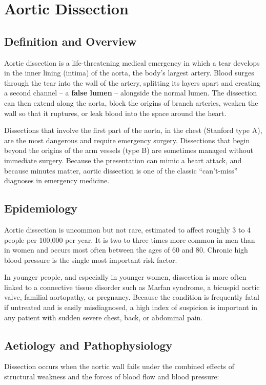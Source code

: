 \chapter{Aortic Dissection}

\section*{Definition and Overview}
Aortic dissection is a life-threatening medical emergency in which a tear develops in the inner lining (intima) of the aorta, the body's largest artery. Blood surges through the tear into the wall of the artery, splitting its layers apart and creating a second channel -- a \textbf{false lumen} -- alongside the normal lumen. The dissection can then extend along the aorta, block the origins of branch arteries, weaken the wall so that it ruptures, or leak blood into the space around the heart.

Dissections that involve the first part of the aorta, in the chest (Stanford type A), are the most dangerous and require emergency surgery. Dissections that begin beyond the origins of the arm vessels (type B) are sometimes managed without immediate surgery. Because the presentation can mimic a heart attack, and because minutes matter, aortic dissection is one of the classic ``can't-miss'' diagnoses in emergency medicine.

\section*{Epidemiology}
Aortic dissection is uncommon but not rare, estimated to affect roughly 3 to 4 people per 100,000 per year. It is two to three times more common in men than in women and occurs most often between the ages of 60 and 80. Chronic high blood pressure is the single most important risk factor.

In younger people, and especially in younger women, dissection is more often linked to a connective tissue disorder such as Marfan syndrome, a bicuspid aortic valve, familial aortopathy, or pregnancy. Because the condition is frequently fatal if untreated and is easily misdiagnosed, a high index of suspicion is important in any patient with sudden severe chest, back, or abdominal pain.

\section*{Aetiology and Pathophysiology}
Dissection occurs when the aortic wall fails under the combined effects of structural weakness and the forces of blood flow and blood pressure:

